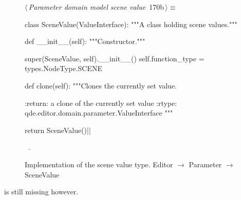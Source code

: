 \documentclass[%
    a4paper,    %
    justified,  %
    nobib,      %
    openany     %
]{tufte-book}
\makeatletter
\renewcommand{\label}[1]{\@tufte@label{##1}}%
\makeatother
\begin{document}
\begin{figure}[!htbp]
\begin{flushleft} \small
\begin{minipage}{\linewidth}\label{scrap139}\raggedright\small
{} $\langle\,${\itshape Parameter domain model scene value}\nobreak\ {\footnotesize {170b}}$\,\rangle\equiv$
\vspace{-1ex}
\begin{pythoncode}
class SceneValue(ValueInterface):
    """A class holding scene values."""

    def __init__(self):
        """Constructor."""

        super(SceneValue, self).__init__()
        self.function_type = types.NodeType.SCENE

    def clone(self):
        """Clones the currently set value.

        :return: a clone of the currently set value
        :rtype:  qde.editor.domain.parameter.ValueInterface
        """

        return SceneValue()|\NWsep|
\end{pythoncode}
\vspace{1.5ex}
\footnotesize
\begin{list}{}{\setlength{\itemsep}{-\parsep}\setlength{\itemindent}{-\leftmargin}}
\item \NWtxtMacroRefIn\ .

\item{}
\end{list}
\end{minipage}\vspace{4ex}
\end{flushleft}
\caption{Implementation of the scene value type.
  \newline{}\newline{}Editor $\rightarrow$ Parameter $\rightarrow$
  SceneValue}
\end{figure}

 is still missing
however.
\end{document}
